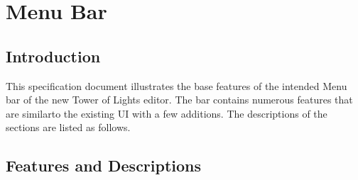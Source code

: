 \documentclass[]{article}
\begin{document}
\section{Menu Bar}



\subsection{Introduction}

{This specification document illustrates the base features of the intended Menu bar of the new Tower of Lights editor. The bar contains numerous features that are similarto the existing UI with a few additions. The descriptions of the sections are listed as follows.}

\subsection{Features and Descriptions}
\end{document}
